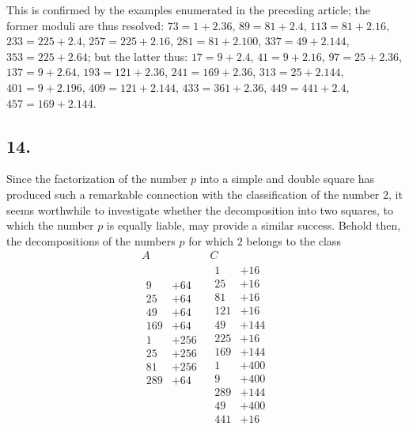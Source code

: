 \documentclass[twoside,12pt]{memoir}
\begin{document}
This is confirmed by the examples enumerated in the preceding article; the former moduli are thus resolved: \(73=1+2.36\), \(89=81+2.4\), \(113=81+2.16\), \(233=225+2.4\), \(257=225+2.16\), \(281=81+2.100\), \(337=49+2.144\), \(353=225+2.64\); but the latter thus: \(17=9+2.4\), \(41=9+2.16\), \(97=25+2.36\), \(137=9+2.64\), \(193=121+2.36\), \(241=169+2.36\), \(313=25+2.144\), \(401=9+2.196\), \(409=121+2.144\), \(433=361+2.36\), \(449=441+2.4\), \(457=169+2.144\).

\subsection*{14.}

Since the factorization of the number \(p\) into a simple and double square has produced such a remarkable connection with the classification of the number \(2\), it seems worthwhile to investigate whether the decomposition into two squares, to which the number \(p\) is equally liable, may provide a similar success. Behold then, the decompositions of the numbers \(p\) for which \(2\) belongs to the class
\[\begin{array}{c|c}
A & C  \\
\hline 
\begin{aligned}
9&+64  \\
25&+64  \\
49&+64 \\
169&+64\\
1&+256 \\
25&+256\\
81&+256\\
289&+64\\
\\
\\
\\
\\
 \end{aligned}
&
\begin{aligned}
 1&+16\\
 25&+16\\
 81&+16\\
 121&+16\\
 49&+144\\
225&+16\\
 169&+144\\
 1&+400\\
9&+400\\
289&+144\\
49&+400\\
441&+16 
\end{aligned}
\end{array}\]\pagebreak%
\end{document}
